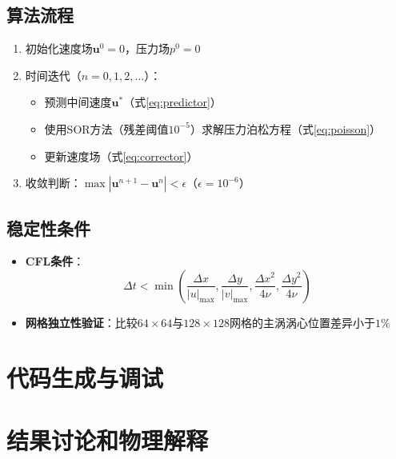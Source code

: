 \documentclass[UTF8]{ctexart}
\begin{document}
\subsection{算法流程}
\begin{enumerate}
    \item 初始化速度场$\mathbf{u}^0 = 0$，压力场$p^0 = 0$
    \item 时间迭代（$n = 0,1,2,\dots$）：
    \begin{itemize}
        \item 预测中间速度$\mathbf{u}^*$（式\ref{eq:predictor}）
        \item 使用SOR方法（残差阈值$10^{-5}$）求解压力泊松方程（式\ref{eq:poisson}）
        \item 更新速度场（式\ref{eq:corrector}）
    \end{itemize}
    \item 收敛判断：$\max|\mathbf{u}^{n+1} - \mathbf{u}^n| < \epsilon$（$\epsilon = 10^{-6}$）
\end{enumerate}

\subsection{稳定性条件}
\begin{itemize}
    \item \textbf{CFL条件}：
    \begin{equation}
    \Delta t < \min\left( \frac{\Delta x}{|u|_{\max}}, \frac{\Delta y}{|v|_{\max}}, \frac{\Delta x^2}{4\nu}, \frac{\Delta y^2}{4\nu} \right)
    \label{eq:cfl}
    \end{equation}
    
    \item \textbf{网格独立性验证}：比较$64\times64$与$128\times128$网格的主涡涡心位置差异小于$1\%$
\end{itemize}


\section{代码生成与调试}


\section{结果讨论和物理解释}



\newpage
\appendix
\end{document}
